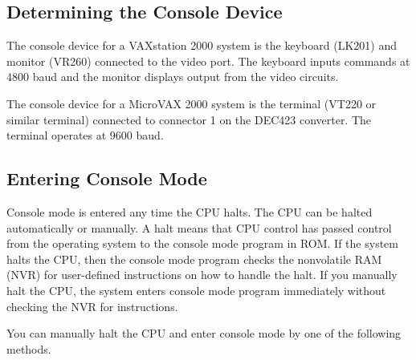 \subsection{Determining the Console Device}

The console device for a VAXstation 2000 system is the keyboard (LK201)
and monitor (VR260) connected to the video port. The keyboard inputs
commands at 4800 baud and the monitor displays output from the video
circuits.

The console device for a MicroVAX 2000 system is the terminal (VT220 or
similar terminal) connected to connector 1 on the DEC423 converter. The
terminal operates at 9600 baud.

\subsection{Entering Console Mode}

Console mode is entered any time the CPU halts. The CPU can be halted
automatically or manually. A halt means that CPU control has passed 
control from the operating system to the console mode program in ROM. If
the system halts the CPU, then the console mode program checks the 
nonvolatile RAM (NVR) for user-defined instructions on how to handle the halt.
If you manually halt the CPU, the system enters console mode program 
immediately without checking the NVR for instructions.

You can manually halt the CPU and enter console mode by one of the
following methods.

